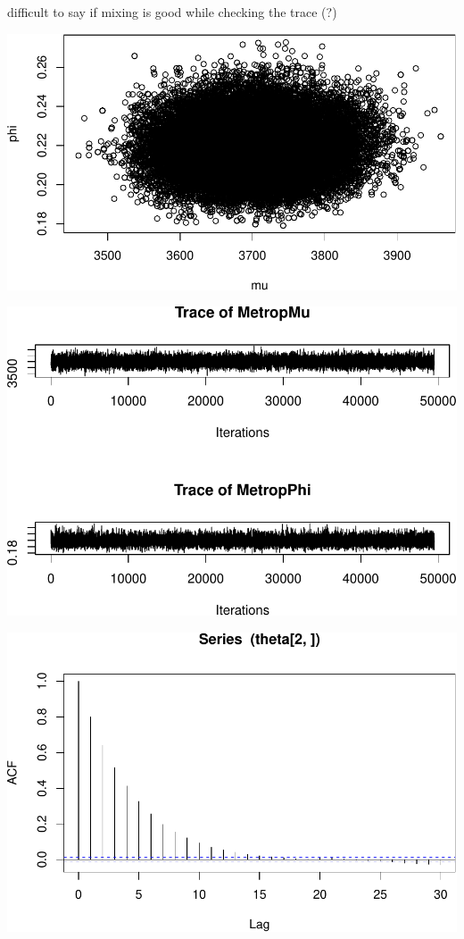 \documentclass[a4paper, 12pt]{article}
\begin{document}
    difficult to say if mixing is good while checking the trace (?)

    \begin{center}\includegraphics[width=0.8\linewidth]{resources/figs/unnamed-chunk-14-1} \end{center}

    \begin{center}\includegraphics[width=0.8\linewidth]{resources/figs/unnamed-chunk-15-1} \end{center}

    \begin{center}\includegraphics[width=0.8\linewidth]{resources/figs/unnamed-chunk-15-2} \end{center}
\end{document}
